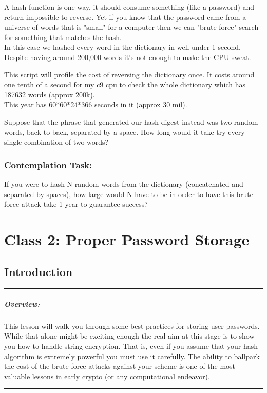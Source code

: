 \documentclass[12pt]{book}
\newenvironment{task}[1][Task:]{ %
    \medskip
    \begin{mdframed}[style=info]
        \noindent{\textbf{#1}}
}{
    \end{mdframed}
}
\newenvironment{overview}
  {\noindent\rule{\textwidth}{0.4pt}
  \paragraph{Overview:}
  }
  {\par
  \noindent\rule{\textwidth}{0.4pt}
  }
\begin{document}
A hash function is one-way, it should consume something (like a password) and return impossible to reverse. Yet if you know that the password came from a universe of words that is "small" for a computer then we can "brute-force" search for something that matches the hash.\\

In this case we hashed every word in the dictionary in well under 1 second. Despite having around 200,000 words it's not enough to make the CPU sweat.


This script will profile the cost of reversing the dictionary once. It costs around one tenth of a second for my c9 cpu to check the whole dictionary which has 187632 words (approx 200k).\\

This year has 60*60*24*366 seconds in it (approx 30 mil).

\begin{task}[Computation Task:]
  Suppose that the phrase that generated our hash digest instead was two random words, back to back, separated by a space. How long would it take try every single combination of two words?
\end{task}

\subsection{Contemplation Task:}
\begin{task}[Reverse that thinking]
  If you were to hash N random words from the dictionary (concatenated and separated by spaces), how large would N have to be in order to have this brute force attack take 1 year to guarantee success?
\end{task}

\chapter{Class 2: Proper Password Storage}

\section{Introduction}

\begin{overview}
  This lesson will walk you through some best practices for storing user passwords. While that alone might be exciting enough the real aim at this stage is to show you how to handle string encryption. That is, even if you assume that your hash algorithm is extremely powerful you must use it carefully. The ability to ballpark the cost of the brute force attacks against your scheme is one of the most valuable lessons in early crypto (or any computational endeavor).
\end{overview}
\end{document}
